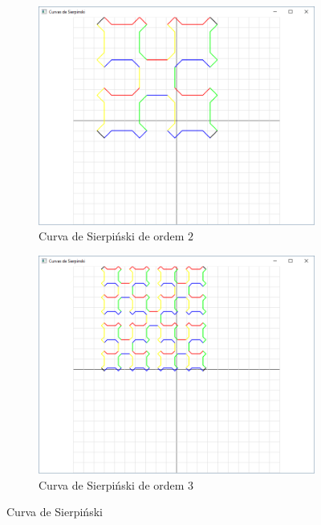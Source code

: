 \begin{enumerate}
  \begin{figure}[!htp]
          \centering
          \begin{subfigure}[b]{0.4\textwidth}
              \centerline{\includegraphics[width=.9\textwidth]{img/cap4_ex16b}}
              \caption{Curva de Sierpiński de ordem $2$}
              \label{fig:cap03_ex14a}
          \end{subfigure}
          \hfill
          \begin{subfigure}[b]{0.4\textwidth}
              \centerline{\includegraphics[width=.9\textwidth]{img/cap4_ex16c}}
              \caption{Curva de Sierpiński de ordem $3$}
              \label{fig:cap03_ex14b}
          \end{subfigure}
          
          \caption{
            \label{fig:koch}%
            Curva de Sierpiński
          }

        \end{figure}
  
\end{enumerate}

